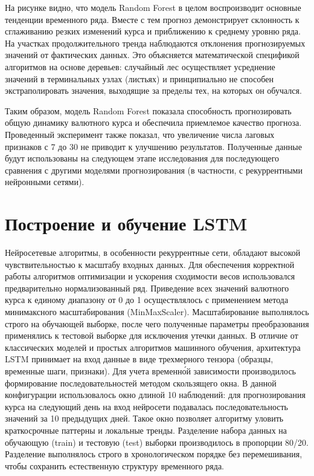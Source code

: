 На рисунке видно, что модель Random Forest в целом воспроизводит основные тенденции временного ряда. Вместе с тем прогноз демонстрирует склонность к сглаживанию резких изменений курса и приближению к среднему уровню ряда. На участках продолжительного тренда наблюдаются отклонения прогнозируемых значений от фактических данных. Это объясняется математической спецификой алгоритмов на основе деревьев: случайный лес осуществляет усреднение значений в терминальных узлах (листьях) и принципиально не способен экстраполировать значения, выходящие за пределы тех, на которых он обучался.

Таким образом, модель Random Forest показала способность прогнозировать общую динамику валютного курса и обеспечила приемлемое качество прогноза. Проведенный эксперимент также показал, что увеличение числа лаговых признаков с 7 до 30 не приводит к улучшению результатов. Полученные данные будут использованы на следующем этапе исследования для последующего сравнения с другими моделями прогнозирования (в частности, с рекуррентными нейронными сетями).

\section{Построение и обучение LSTM}
Нейросетевые алгоритмы, в особенности рекуррентные сети, обладают высокой чувствительностью к масштабу входных данных. Для обеспечения корректной работы алгоритмов оптимизации и ускорения сходимости весов использовался предварительно нормализованный ряд. Приведение всех значений валютного курса к единому диапазону от 0 до 1 осуществлялось с применением метода минимаксного масштабирования (MinMaxScaler). Масштабирование выполнялось строго на обучающей выборке, после чего полученные параметры преобразования применялись к тестовой выборке для исключения утечки данных.
В отличие от классических моделей и простых алгоритмов машинного обучения, архитектура LSTM принимает на вход данные в виде трехмерного тензора (образцы, временные шаги, признаки). Для учета временно́й зависимости производилось формирование последовательностей методом скользящего окна. В данной конфигурации использовалось окно длиной 10 наблюдений: для прогнозирования курса на следующий день на вход нейросети подавалась последовательность значений за 10 предыдущих дней. Такое окно позволяет алгоритму уловить краткосрочные паттерны и локальные тренды.
Разделение набора данных на обучающую (train) и тестовую (test) выборки производилось в пропорции 80/20. Разделение выполнялось строго в хронологическом порядке без перемешивания, чтобы сохранить естественную структуру временного ряда.

